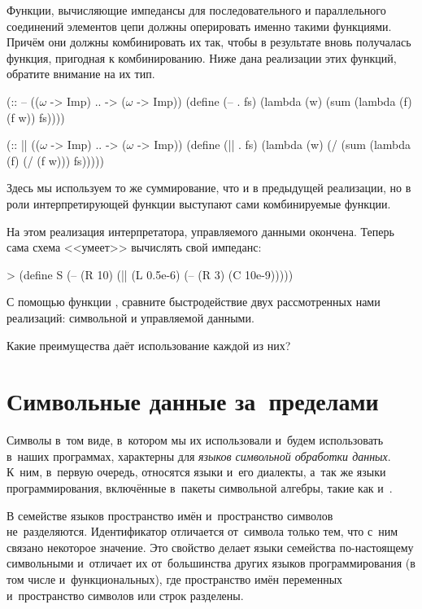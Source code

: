 Функции, вычисляющие импедансы для последовательного и параллельного соединений элементов цепи должны оперировать именно такими функциями. Причём они должны комбинировать их так, чтобы в результате вновь получалась функция, пригодная к комбинированию. Ниже дана реализации этих функций, обратите внимание на их тип.
\begin{Definition}
(:: -- (($\omega$ -> Imp) .. -> ($\omega$ -> Imp))
  (define (-- . fs) 
    (lambda (w) (sum (lambda (f) (f w)) fs))))

(:: || (($\omega$ -> Imp) .. -> ($\omega$ -> Imp))
  (define (|| . fs) 
    (lambda (w) (/ (sum (lambda (f) (/ (f w))) fs)))))
\end{Definition}
Здесь мы используем то же суммирование, что и в предыдущей реализации, но в роли интерпретирующей функции  выступают сами комбинируемые функции.

На этом реализация интерпретатора, управляемого данными окончена. Теперь сама схема <<умеет>> вычислять свой импеданс:
\begin{SchemeCode}
> (define S
    (-- (R 10)
        (|| (L 0.5e-6)
            (-- (R 3)
                (C 10e-9)))))
\end{SchemeCode}

\begin{Assignment}
 С помощью функции , сравните быстродействие двух рассмотренных нами реализаций: символьной и управляемой данными.

 Какие преимущества даёт использование каждой из них?
\end{Assignment}


\section{Символьные данные \mbox{за~пределами~\Scheme}}%
Символы в~том виде, в~котором мы их использовали и~будем использовать в~наших программах, характерны для \emph{языков символьной обработки данных}. К~ним, в~первую очередь, относятся языки  \Lisp и~его диалекты, а~так же языки программирования, включённые в~пакеты символьной алгебры, такие как  и~.

В семействе языков \Lisp пространство имён и~пространство символов не~разделяются. Идентификатор отличается от~символа только тем, что с~ним связано некоторое значение. Это свойство делает языки семейства \Lisp по-настоящему символьными и~отличает их от~большинства других языков программирования (в том числе и~функциональных), где пространство имён переменных и~пространство символов или строк разделены.

